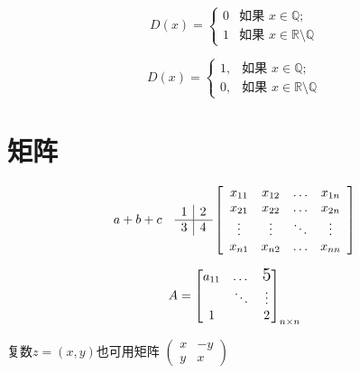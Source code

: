 \documentclass{article}
\begin{document}
    $$
    D(x) = \left\{
    \begin{array}{ll}
    {0} & \text{如果 } x \in \mathbb{Q}; \\ 
    {1} & \text{如果 } x \in \mathbb{R} \setminus \mathbb{Q}
    \end{array}\right.
    $$

    \begin{equation}
    D(x) = \begin{cases}
    1, & \text{如果 } x \in \mathbb{Q}; \\
    0, & \text{如果 } x \in \mathbb{R} \setminus \mathbb{Q}
    \end{cases}
    \end{equation}


    \section{矩阵}
    \[
    a + b \\ + c\quad %
    \begin{array}{l | l}
    {1} & {2} \\ 
    \hline
    {3} & {4}
    \end{array} 
    \left[\begin{array}{cccc}
    {x_{11}} & {x_{12}} & {\dots} & {x_{1 n}} \\ 
    {x_{21}} & {x_{22}} & {\dots} & {x_{2 n}} \\ 
    {\vdots} & {\vdots} & {\ddots} & {\vdots} \\ 
    {x_{n 1}} & {x_{n 2}} & {\dots} & {x_{n n}}
    \end{array}\right]
    \]

    \[
    A = \begin{bmatrix}
        a_{11} & \dots & \text{\Large5}\\ %
        & \ddots  & \vdots \\ %
        1 &  & 2    
    \end{bmatrix}_{n \times n} %
    \]

    复数$z = (x, y)$也可用矩阵 
    \begin{math}
    \left(\begin{smallmatrix}
    x & -y \\
    y & x   
    \end{smallmatrix}\right) %
    \end{math}
\end{document}
